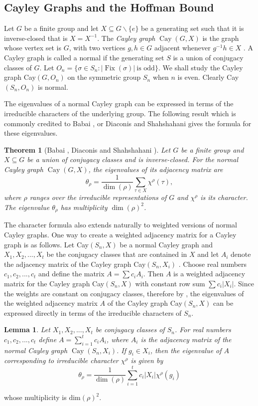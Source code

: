 \documentclass[12pt]{article}
\newtheorem{theorem}{Theorem}
\newtheorem{lemma}{Lemma}[section]
\theoremstyle{definition}
\newcommand{\1}{\mathbf 1}
\newcommand{\Fix}{\operatorname{Fix}}
\newcommand{\Cay}{\operatorname{Cay}}
\begin{document}
    




\subsection{Cayley Graphs and the Hoffman Bound}
Let $G$ be a finite group and let $X\subseteq G \backslash \{e\} $ be a generating set such that it is inverse-closed that is
$X=X^{-1}$. The \textit{Cayley graph}
$\operatorname{Cay}(G,X)$ is the graph whose vertex set is $G$, with two
vertices $g,h\in G$ adjacent whenever $g^{-1}h\in X$ .
A Cayley graph is called a normal if the generating set
$S$ is a union of conjugacy classes of $G$. 
 Let
$O_n=\{\sigma\in S_n:|\Fix(\sigma)|\   \text{is odd}\}$. We shall study the Cayley graph Cay$(G,O_n)$ on the symmetric group $S_n$ when $n$ is even. Clearly Cay$(S_n,O_n)$ is normal.

The eigenvalues of a normal Cayley graph can be expressed in terms of the
irreducible characters of the underlying group. The following result which is commonly credited to Babai \cite{babai1979spectra}, or Diaconis and Shahshahani \cite{diaconis1981generating} gives
the formula for these eigenvalues.
\begin{theorem}[Babai \cite{babai1979spectra}, Diaconis and Shahshahani \cite{diaconis1981generating}]\label{thm:Eigenvalue_chatacter_formula}
Let $G$ be a finite group and $X \subseteq G$ be a union of conjugacy classes and is inverse-closed. For the normal Cayley graph
$\operatorname{Cay}(G,X)$, the eigenvalues of its adjacency matrix are
\[
\theta_\rho
=
\frac{1}{\dim(\rho)}
\sum_{\tau\in X}\chi^\rho(\tau),
\]
where $\rho$ ranges over the irreducible representations of $G$ and
$\chi^\rho$ is its character. The eigenvalue $\theta_\rho$ has
multiplicity $\dim(\rho)^2$.
\end{theorem}

The character formula also extends naturally to weighted versions of normal Cayley graphs. One way to create a weighted adjacency matrix for a Cayley graph is as follows. Let Cay$(S_n,X)$ be a normal Cayley graph and $X_1,X_2,...,X_t$ be the conjugacy classes that are contained in $X$ and let $A_i$ denote the adjacency matrix of the Cayley graph Cay$(S_n,X_i)$ . Choose real numbers $c_1,c_2,...,c_t$ and define the matrix $A=\sum{c_iA_i}$. Then $A$ is a weighted adjacency matrix for the Cayley graph Cay$(S_n,X)$ with constant row sum $\sum{c_i |X_i|}$. Since the weights are constant on conjugacy classes, therefore by  , the eigenvalues of the weighted adjacency matrix $A$ of the Cayley graph Cay$(S_n,X)$ can be expressed directly in terms of the irreducible characters of \(S_n\).
\begin{lemma}\label{lem:Weighted_Adjacency_eigenvlues}
 Let $X_1,X_2,...,X_t$ be conjugacy classes of $S_n$. For real numbers $c_1,c_2,...,c_t$ define $A=\sum_{i=1}^{t}c_i A_i$, where $A_i$ is the adjacency matrix of the normal Cayley graph $\Cay(S_n,X_i)$. If $g_i \in X_i$, then the eigenvalue of $A$ corresponding to irreducible character $\chi^{\rho}$ is given by
    \[\theta_{\rho}=\frac{1}{\dim(\rho)} \sum_{i=1}^{t}c_i|X_i| \chi^{\rho}(g_i)\]
\end{lemma}
whose multiplicity is $\text{dim}(\rho)^2$.
\end{document}
